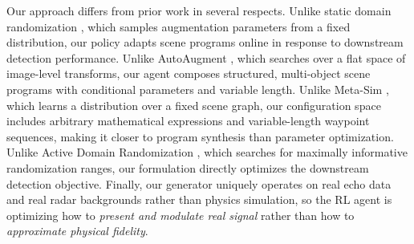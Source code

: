 \documentclass[12pt]{article}
\begin{document}
Our approach differs from prior work in several respects. Unlike static domain randomization \citep{Tobin2017DomainRandomization, Tremblay2018TrainingDNN}, which samples augmentation parameters from a fixed distribution, our policy adapts scene programs online in response to downstream detection performance. Unlike AutoAugment \citep{Cubuk2019AutoAugment}, which searches over a flat space of image-level transforms, our agent composes structured, multi-object scene programs with conditional parameters and variable length. Unlike Meta-Sim \citep{Kar2019MetaSim}, which learns a distribution over a fixed scene graph, our configuration space includes arbitrary mathematical expressions and variable-length waypoint sequences, making it closer to program synthesis than parameter optimization. Unlike Active Domain Randomization \citep{Mehta2020ActiveDR}, which searches for maximally informative randomization ranges, our formulation directly optimizes the downstream detection objective. Finally, our generator uniquely operates on real echo data and real radar backgrounds rather than physics simulation, so the RL agent is optimizing how to \textit{present and modulate real signal} rather than how to \textit{approximate physical fidelity}.
\end{document}
